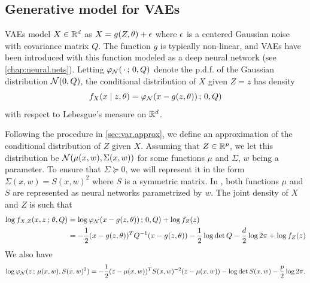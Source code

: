 \subsection{Generative model for VAEs}
\label{sec:vae}
VAEs \citep{kingma2014auto-encoding,kingma2019introduction} model $X\in {\mathbb{R}}^d$ as $X = g(Z, \theta) + \epsilon$ where $\epsilon$ is a centered Gaussian noise with covariance matrix $Q$. The function $g$ is typically non-linear, and VAEs have been introduced with this function modeled as a deep neural network (see \cref{chap:neural.nets}). Letting $\varphi_{\mathcal N}(\,\cdot\,;\,0, Q)$ denote the p.d.f. of the Gaussian distribution ${\mathcal N}(0, Q)$, the conditional distribution of $X$ given $Z=z$ has density
\[
f_X(x\mid z, \theta) = \varphi_{\mathcal N}(x - g(z, \theta))\,;\, 0, Q)
\]
with respect to Lebesgue's measure on ${\mathbb{R}}^d$.

Following the procedure in \cref{sec:var.approx}, we define an approximation of the conditional distribution of $Z$ given $X$. Assuming that $Z\in {\mathbb{R}}^p$, we let this distribution be ${\mathcal N}(\mu(x, w), \Sigma(x, w))$ for some functions $\mu$ and $\Sigma$, $w$ being a parameter. To ensure that $\Sigma \succeq 0$, we will represent it in the form $\Sigma(x, w) = S(x, w)^2$ where $S$ is a symmetric matrix. In \citep{kingma2014auto-encoding}, both functions $\mu$ and $S$ are represented as neural networks parametrized by $w$. The joint density of $X$ and $Z$ is such that
\begin{align*}
\log f_{X,Z}(x,z\,;\,\theta, Q) &= \log \varphi_{\mathcal N}(x - g(z, \theta))\,;\, 0, Q) + \log f_Z(z)\\
&= -\frac12 (x - g(z, \theta))^T Q^{-1} (x - g(z, \theta)) - \frac12 \log \det Q - \frac d2 \log 2\pi + \log f_Z(z)
\end{align*}
We also have
\[
\log \varphi_{\mathcal N}(z\,;\, \mu(x, w), S(x, w)^2) = -\frac12 (z - \mu(x,w))^T S(x, w)^{-2} (z - \mu(x,w)) - \log\det S(x, w) - \frac p2 \log 2\pi.
\]

